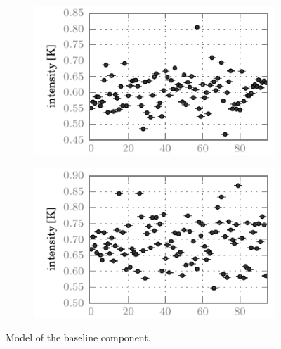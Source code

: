 \begin{figure}[hbtp]
    \centering
    \begin{subfigure}[b]{0.5\textwidth}
        \includegraphics{co87_base_inte}
        \caption{}
    \end{subfigure}%
    \begin{subfigure}[b]{0.5\textwidth}
        \includegraphics{co98_base_inte}
        \caption{}
    \end{subfigure}%
    \caption{
        Model of the baseline component.
    }
    \label{fig:fit_base}
\end{figure}

